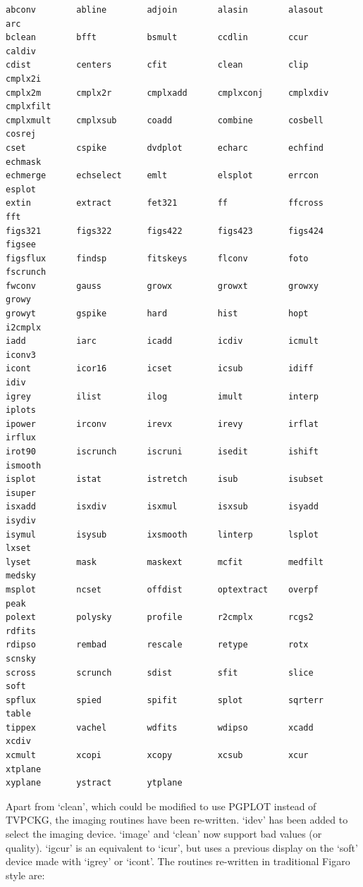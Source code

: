 \documentclass[11pt,twoside]{article}
\begin{document}
\begin{verbatim}
abconv        abline        adjoin        alasin        alasout       arc
bclean        bfft          bsmult        ccdlin        ccur          caldiv
cdist         centers       cfit          clean         clip          cmplx2i
cmplx2m       cmplx2r       cmplxadd      cmplxconj     cmplxdiv      cmplxfilt
cmplxmult     cmplxsub      coadd         combine       cosbell       cosrej
cset          cspike        dvdplot       echarc        echfind       echmask
echmerge      echselect     emlt          elsplot       errcon        esplot
extin         extract       fet321        ff            ffcross       fft
figs321       figs322       figs422       figs423       figs424       figsee
figsflux      findsp        fitskeys      flconv        foto          fscrunch
fwconv        gauss         growx         growxt        growxy        growy
growyt        gspike        hard          hist          hopt          i2cmplx
iadd          iarc          icadd         icdiv         icmult        iconv3
icont         icor16        icset         icsub         idiff         idiv
igrey         ilist         ilog          imult         interp        iplots
ipower        irconv        irevx         irevy         irflat        irflux
irot90        iscrunch      iscruni       isedit        ishift        ismooth
isplot        istat         istretch      isub          isubset       isuper
isxadd        isxdiv        isxmul        isxsub        isyadd        isydiv
isymul        isysub        ixsmooth      linterp       lsplot        lxset
lyset         mask          maskext       mcfit         medfilt       medsky
msplot        ncset         offdist       optextract    overpf        peak
polext        polysky       profile       r2cmplx       rcgs2         rdfits
rdipso        rembad        rescale       retype        rotx          scnsky
scross        scrunch       sdist         sfit          slice         soft
spflux        spied         spifit        splot         sqrterr       table
tippex        vachel        wdfits        wdipso        xcadd         xcdiv
xcmult        xcopi         xcopy         xcsub         xcur          xtplane
xyplane       ystract       ytplane
\end{verbatim}

   Apart from `clean', which could be modified to use PGPLOT instead of
   TVPCKG, the imaging routines have been re-written.  `idev' has been
   added to select the imaging device.  `image' and `clean' now support
   bad values (or quality).  `igcur' is an equivalent to `icur', but
   uses a previous display on the `soft' device made with `igrey' or
   `icont'.  The routines re-written in traditional Figaro style are:
\end{document}
